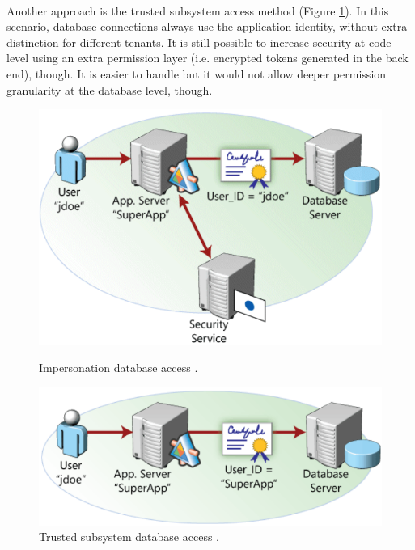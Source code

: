 \documentclass[12pt,english]{article} %
\begin{document}
\

Another approach is the trusted subsystem access method (Figure \ref{fig:trusted-subsystem-database-access}).
In this scenario, database connections always use the application identity, without extra distinction for different tenants.
It is still possible to increase security at code level using an extra permission layer (i.e. encrypted tokens generated in the back end), though.
It is easier to handle but it would not allow deeper permission granularity at the database level, though.

\begin{figure}[h]
    \centering
    \begin{minipage}[t]{.5\textwidth}
      \centering
      \includegraphics[width=0.75\linewidth]{img/db/impersonation-database-access.png}
      \caption{Impersonation database access \cite{multi-tenant-data-architecture}.
      \label{fig:impersonation-database-access}}
    \end{minipage}%
    \begin{minipage}[t]{.5\textwidth}
      \centering
      \includegraphics[width=1\linewidth]{img/db/trusted-subsystem-database-access.png}
      \caption{Trusted subsystem database access \cite{multi-tenant-data-architecture}. \label{fig:trusted-subsystem-database-access}}
    \end{minipage}
\end{figure}
\end{document}
